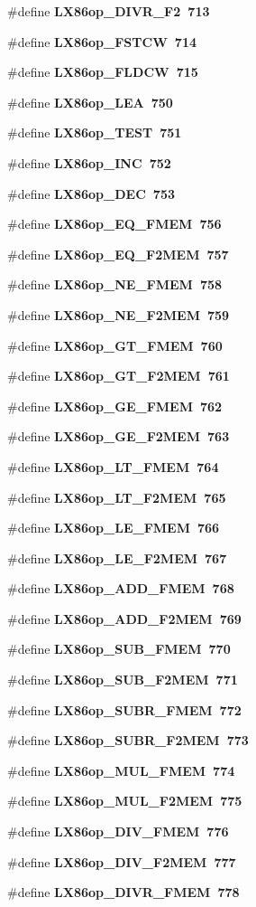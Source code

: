 \begin{CompactItemize}
\item 
\#define \bf{LX86op\_\-DIVR\_\-F2}~713
\item 
\#define \bf{LX86op\_\-FSTCW}~714
\item 
\#define \bf{LX86op\_\-FLDCW}~715
\item 
\#define \bf{LX86op\_\-LEA}~750
\item 
\#define \bf{LX86op\_\-TEST}~751
\item 
\#define \bf{LX86op\_\-INC}~752
\item 
\#define \bf{LX86op\_\-DEC}~753
\item 
\#define \bf{LX86op\_\-EQ\_\-FMEM}~756
\item 
\#define \bf{LX86op\_\-EQ\_\-F2MEM}~757
\item 
\#define \bf{LX86op\_\-NE\_\-FMEM}~758
\item 
\#define \bf{LX86op\_\-NE\_\-F2MEM}~759
\item 
\#define \bf{LX86op\_\-GT\_\-FMEM}~760
\item 
\#define \bf{LX86op\_\-GT\_\-F2MEM}~761
\item 
\#define \bf{LX86op\_\-GE\_\-FMEM}~762
\item 
\#define \bf{LX86op\_\-GE\_\-F2MEM}~763
\item 
\#define \bf{LX86op\_\-LT\_\-FMEM}~764
\item 
\#define \bf{LX86op\_\-LT\_\-F2MEM}~765
\item 
\#define \bf{LX86op\_\-LE\_\-FMEM}~766
\item 
\#define \bf{LX86op\_\-LE\_\-F2MEM}~767
\item 
\#define \bf{LX86op\_\-ADD\_\-FMEM}~768
\item 
\#define \bf{LX86op\_\-ADD\_\-F2MEM}~769
\item 
\#define \bf{LX86op\_\-SUB\_\-FMEM}~770
\item 
\#define \bf{LX86op\_\-SUB\_\-F2MEM}~771
\item 
\#define \bf{LX86op\_\-SUBR\_\-FMEM}~772
\item 
\#define \bf{LX86op\_\-SUBR\_\-F2MEM}~773
\item 
\#define \bf{LX86op\_\-MUL\_\-FMEM}~774
\item 
\#define \bf{LX86op\_\-MUL\_\-F2MEM}~775
\item 
\#define \bf{LX86op\_\-DIV\_\-FMEM}~776
\item 
\#define \bf{LX86op\_\-DIV\_\-F2MEM}~777
\item 
\#define \bf{LX86op\_\-DIVR\_\-FMEM}~778
\item 

\end{CompactItemize}
